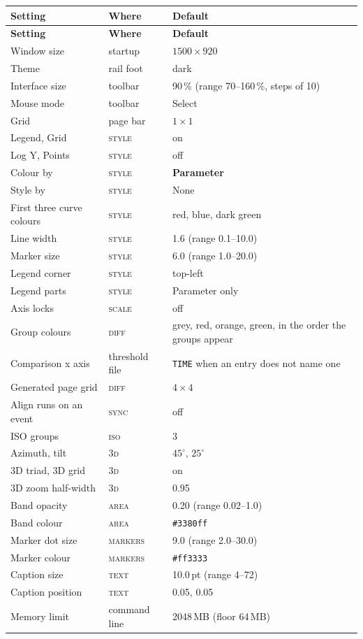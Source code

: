 \documentclass[11pt,a4paper,oneside]{report}
\newcommand{\code}[1]{\texttt{#1}}
\newcommand{\tab}[1]{\textsc{#1}}
\begin{document}
\begin{center}
\small
\begin{longtable}{@{}p{}p{}p{}@{}}
\toprule
\textbf{Setting} & \textbf{Where} & \textbf{Default} \\
\midrule
\endfirsthead
\toprule
\textbf{Setting} & \textbf{Where} & \textbf{Default} \\
\midrule
\endhead
Window size & startup & $1500 \times 920$ \\
Theme & rail foot & dark \\
Interface size & toolbar & 90\,\% (range 70--160\,\%, steps of 10) \\
Mouse mode & toolbar & Select \\
Grid & page bar & $1 \times 1$ \\
Legend, Grid & \tab{style} & on \\
Log Y, Points & \tab{style} & off \\
Colour by & \tab{style} & \textbf{Parameter} \\
Style by & \tab{style} & None \\
First three curve colours & \tab{style} & red, blue, dark green \\
Line width & \tab{style} & 1.6 (range 0.1--10.0) \\
Marker size & \tab{style} & 6.0 (range 1.0--20.0) \\
Legend corner & \tab{style} & top-left \\
Legend parts & \tab{style} & Parameter only \\
Axis locks & \tab{scale} & off \\
Group colours & \tab{diff} & grey, red, orange, green, in the order the groups appear \\
Comparison x axis & threshold file & \code{TIME} when an entry does not name one \\
Generated page grid & \tab{diff} & $4 \times 4$ \\
Align runs on an event & \tab{sync} & off \\
ISO groups & \tab{iso} & 3 \\
Azimuth, tilt & \tab{3d} & $45^\circ$, $25^\circ$ \\
3D triad, 3D grid & \tab{3d} & on \\
3D zoom half-width & \tab{3d} & 0.95 \\
Band opacity & \tab{area} & 0.20 (range 0.02--1.0) \\
Band colour & \tab{area} & \code{\#3380ff} \\
Marker dot size & \tab{markers} & 9.0 (range 2.0--30.0) \\
Marker colour & \tab{markers} & \code{\#ff3333} \\
Caption size & \tab{text} & 10.0\,pt (range 4--72) \\
Caption position & \tab{text} & 0.05, 0.05 \\
Memory limit & command line & 2048\,MB (floor 64\,MB) \\
\bottomrule
\end{longtable}
\end{center}
\end{document}
